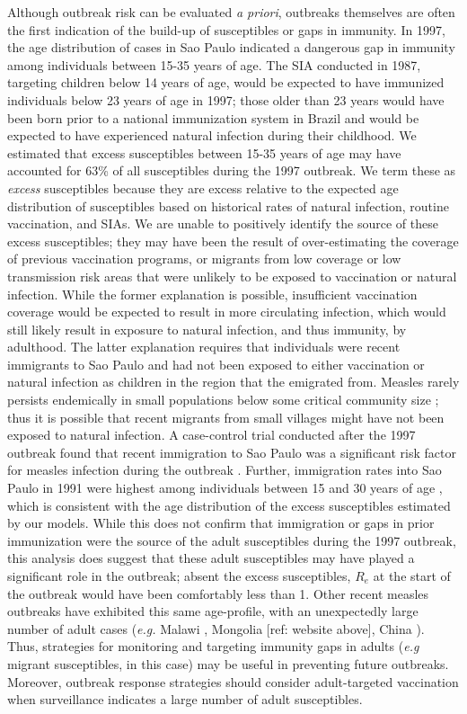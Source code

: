 Although outbreak risk can be evaluated \emph{a priori}, outbreaks themselves are often the first indication of the build-up of susceptibles or gaps in immunity. In 1997, the age distribution of cases in Sao Paulo indicated a dangerous gap in immunity among individuals between 15-35 years of age. The SIA conducted in 1987, targeting children below 14 years of age, would be expected to have immunized individuals below 23 years of age in 1997; those older than 23 years would have been born prior to a national immunization system in Brazil and would be expected to have experienced natural infection during their childhood. We estimated that excess susceptibles between 15-35 years of age may have accounted for 63\% of all susceptibles during the 1997 outbreak. We term these as \emph{excess} susceptibles because they are excess relative to the expected age distribution of susceptibles based on historical rates of natural infection, routine vaccination, and SIAs. We are unable to positively identify the source of these excess susceptibles; they may have been the result of over-estimating the coverage of previous vaccination programs, or migrants from low coverage or low transmission risk areas that were unlikely to be exposed to vaccination or natural infection. While the former explanation is possible, insufficient vaccination coverage would be expected to result in more circulating infection, which would still likely result in exposure to natural infection, and thus immunity, by adulthood. The latter explanation requires that individuals were recent immigrants to Sao Paulo and had not been exposed to either vaccination or natural infection as children in the region that the emigrated from. Measles rarely persists endemically in small populations below some critical community size \cite{Conlan_2007, 8974392}; thus it is possible that recent migrants from small villages might have not been exposed to natural infection.  A case-control trial conducted after the 1997 outbreak found that recent immigration to Sao Paulo was a significant risk factor for measles infection during the outbreak \citet{Camargo_2000} . Further, immigration rates into Sao Paulo in 1991 were highest among individuals between 15 and 30 years of age \cite{de_Moraes_2016}, which is consistent with the age distribution of the excess susceptibles estimated by our models. While this does not confirm that immigration or gaps in prior immunization were the source of the adult susceptibles during the 1997 outbreak, this analysis does suggest that these adult susceptibles may have played a significant role in the outbreak; absent the excess susceptibles, $R_e$ at the start of the outbreak would have been comfortably less than 1. Other recent measles outbreaks have exhibited this same age-profile, with an unexpectedly large number of adult cases (\emph{e.g.} Malawi \cite{Minetti_2013}, Mongolia [ref: website above], China \cite{Zheng_2015}). Thus, strategies for monitoring and targeting immunity gaps in adults (\emph{e.g} migrant susceptibles, in this case) may be useful in preventing future outbreaks. Moreover, outbreak response strategies should consider adult-targeted vaccination when surveillance indicates a large number of adult susceptibles.

